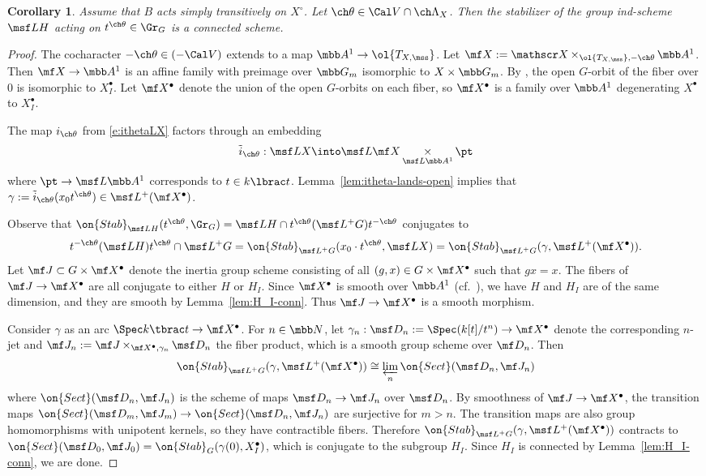 \documentclass[final]{amsart}
\newtheorem{cor}[subsubsection]{Corollary}
\theoremstyle{remark}
\theoremstyle{definition}
\DeclareMathOperator*{\xt}{\times}
\numberwithin{equation}{section}
\begin{document}
\begin{cor} \label{cor:stab-conn}
Assume that $B$ acts simply transitively on $X^\circ$. 
Let $\ch\theta \in \Cal V \cap \ch\Lambda_X$. 
Then the stabilizer of the group ind-scheme $\msf L H$ acting on $t^{\ch\theta} \in \Gr_G$
is a connected scheme.
\end{cor}
\begin{proof}
The cocharacter $-\ch\theta \in (-\Cal V)$ extends to a map 
$\mbb A^1 \to \ol{T_{X,\mss}}$. 
Let $\mf X := \mathscr X \xt_{\ol{T_{X,\mss}},-\ch\theta} \mbb A^1$. 
Then $\mf X \to \mbb A^1$ is an affine family with preimage over $\mbb G_m$ isomorphic
to $X \times \mbb G_m$. By \cite[Proposition 2.5.3]{SV}, the 
open $G$-orbit of the fiber over $0$ is isomorphic to $X_I^\bullet$. 
Let $\mf X^\bullet$ denote the union of the open $G$-orbits on each fiber,
so $\mf X^\bullet$ is a family over $\mbb A^1$ degenerating $X^\bullet$ to $X^\bullet_I$. 

The map $i_{\ch\theta}$ from \eqref{e:ithetaLX} 
factors through an embedding 
\[ \tilde i_{\ch\theta}: \msf L X \into \msf L \mf X \xt_{\msf L \mbb A^1} \pt \]
where $\pt \to \msf L \mbb A^1$ corresponds to $t \in k\lbrac t$. 
Lemma~\ref{lem:itheta-lands-open} implies that  
$\gamma := \tilde i_{\ch\theta}(x_0 t^{\ch\theta}) \in \msf L^+(\mf X^\bullet)$. 

Observe that $\on{Stab}_{\msf L H}(t^{\ch\theta}, \Gr_G) = 
\msf L H \cap t^{\ch\theta} (\msf L^+ G) t^{-\ch\theta}$ conjugates to 
\[ t^{-\ch\theta} (\msf L H) t^{\ch\theta} \cap \msf L^+G = 
\on{Stab}_{\msf L^+G}( x_0 \cdot t^{\ch\theta}, \msf L X ) = \on{Stab}_{\msf L^+G}( \gamma, \msf L^+(\mf X^\bullet) ). 
\]
Let $\mf J \subset G \times \mf X^\bullet$ denote the inertia group scheme
consisting of all $(g,x) \in G \times \mf X^\bullet$ such that $g x = x$. 
The fibers of $\mf J \to \mf X^\bullet$ are all conjugate to either $H$ or $H_I$. 
Since $\mf X^\bullet$ is smooth over $\mbb A^1$ (cf.~\cite[Corollary 5.2.3]{GN}), 
we have $H$ and $H_I$ are of the same dimension,
and they are smooth by Lemma~\ref{lem:H_I-conn}. 
Thus $\mf J \to \mf X^\bullet$ is a smooth morphism. 

Consider $\gamma$ as an arc $\Spec k\tbrac t \to \mf X^\bullet$. 
For $n\in \mbb N$, let $\gamma_n : \msf D_n := \Spec (k[t]/t^n) \to \mf X^\bullet$ denote the
corresponding $n$-jet and $\mf J_n := \mf J \xt_{\mf X^\bullet,\gamma_n} \msf D_n$ the
fiber product, which is a smooth group scheme over $\mf D_n$. 
Then 
\[ \on{Stab}_{\msf L^+G}( \gamma, \msf L^+(\mf X^\bullet) ) \cong 
\varprojlim_n \on{Sect}( \msf D_n, \mf J_n) 
\] 
where $\on{Sect}( \msf D_n, \mf J_n)$ 
is the scheme of maps $\msf D_n \to \mf J_n$ over $\msf D_n$. 
By smoothness of $\mf J \to \mf X^\bullet$, the
transition maps $\on{Sect}( \msf D_m, \mf J_m) \to \on{Sect}( \msf D_n, \mf J_n)$
are surjective for $m > n$. 
The transition maps are also group homomorphisms with unipotent kernels, so they
have contractible fibers. Therefore 
$\on{Stab}_{\msf L^+G}(\gamma, \msf L^+(\mf X^\bullet))$ contracts to 
$\on{Sect}(\msf D_0, \mf J_0) = \on{Stab}_G(\gamma(0), X_I^\bullet)$, which is conjugate
to the subgroup $H_I$. Since $H_I$ is connected by Lemma~\ref{lem:H_I-conn}, we are done.
\end{proof}
\end{document}
